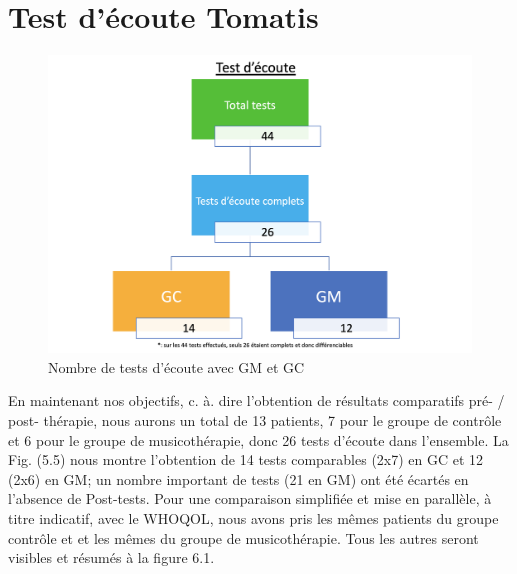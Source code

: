  \section{Test d'écoute Tomatis\textsuperscript \textregistered }
 
 
 \begin{figure}[th]
 	\centering
 	\includegraphics[width=0.7\linewidth]{images/Testecoute.png}
 	\caption[Nombre de tests d'écoute avec GM et GC]{Nombre de tests d'écoute avec GM et GC}
 	
 \end{figure}

En maintenant nos objectifs, c. à. dire l'obtention de  résultats comparatifs pré- / post- thé\-ra\-pie,  
nous 
aurons un total de 13 patients, 7 pour le groupe de contrôle 
et 
6 pour 
le groupe de musicothérapie, donc 26 tests d'écoute dans l'ensemble.
 La Fig. (5.5) nous montre l'obtention de 14 tests comparables (2x7) en GC et 12 (2x6) 
 en GM;
 un nombre important de tests (21 en GM) ont été 
 écartés en l'absence de Post-tests. 
 Pour une comparaison simplifiée et mise en parallèle, à titre indicatif, avec le WHOQOL, nous avons pris 
 les mêmes   
 patients du groupe contrôle  et et les mêmes du groupe de musicothérapie. %
 Tous les autres seront visibles et résumés à la figure 6.1.

